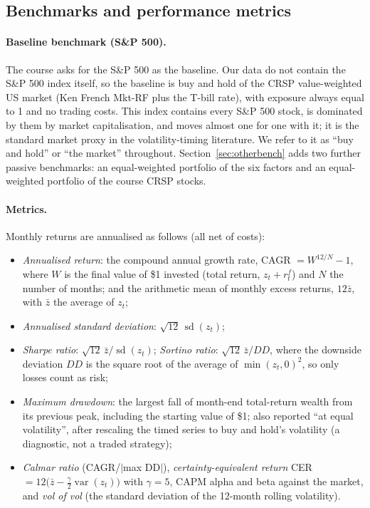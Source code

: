 \documentclass[12pt]{article}
\begin{document}
\subsection{Benchmarks and performance metrics}
\paragraph{Baseline benchmark (S\&P 500).} The course asks for the S\&P 500 as the baseline. Our data do not contain the S\&P 500 index itself, so the baseline is buy and hold of the CRSP value-weighted US market (Ken French Mkt-RF plus the T-bill rate), with exposure always equal to 1 and no trading costs. This index contains every S\&P 500 stock, is dominated by them by market capitalisation, and moves almost one for one with it; it is the standard market proxy in the volatility-timing literature. We refer to it as ``buy and hold'' or ``the market'' throughout. Section~\ref{sec:otherbench} adds two further passive benchmarks: an equal-weighted portfolio of the six factors and an equal-weighted portfolio of the course CRSP stocks.

\paragraph{Metrics.} Monthly returns are annualised as follows (all net of costs):
\begin{itemize}
\item \textit{Annualised return}: the compound annual growth rate, CAGR $=W^{12/N}-1$, where $W$ is the final value of \$1 invested (total return, $z_t+r^f_t$) and $N$ the number of months; and the arithmetic mean of monthly excess returns, $12\bar z$, with $\bar z$ the average of $z_t$;
\item \textit{Annualised standard deviation}: $\sqrt{12}\,\operatorname{sd}(z_t)$;
\item \textit{Sharpe ratio}: $\sqrt{12}\,\bar z/\operatorname{sd}(z_t)$; \textit{Sortino ratio}: $\sqrt{12}\,\bar z/DD$, where the downside deviation $DD$ is the square root of the average of $\min(z_t,0)^2$, so only losses count as risk;
\item \textit{Maximum drawdown}: the largest fall of month-end total-return wealth from its previous peak, including the starting value of \$1; also reported ``at equal volatility'', after rescaling the timed series to buy and hold's volatility (a diagnostic, not a traded strategy);
\item \textit{Calmar ratio} (CAGR/$|$max DD$|$), \textit{certainty-equivalent return} CER $=12\bigl(\bar z-\frac{\gamma}{2}\operatorname{var}(z_t)\bigr)$ with $\gamma=5$, CAPM alpha and beta against the market, and \textit{vol of vol} (the standard deviation of the 12-month rolling volatility).
\end{itemize}
\end{document}

